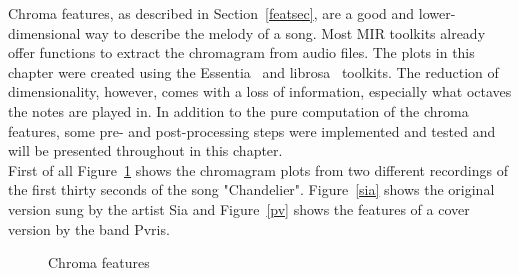 Chroma features, as described in Section~\ref{featsec}, are a good and lower-dimensional way to describe the melody of a song. Most MIR toolkits already offer functions to extract the chromagram from audio files. The plots in this chapter were created using the Essentia~\cite{essentia1} and librosa~\cite{librosa1} toolkits. 
The reduction of dimensionality, however, comes with a loss of information, especially what octaves the notes are played in. In addition to the pure computation of the chroma features, some pre- and post-processing steps were implemented and tested and will be presented throughout in this chapter.\\
First of all Figure~\ref{fig:chroma1} shows the chromagram plots from two different recordings of the first thirty seconds of the song "Chandelier". Figure~\ref{sia} shows the original version sung by the artist Sia and Figure~\ref{pv} shows the features of a cover version by the band Pvris. 
\begin{figure}[htbp]
	\centering
	\caption{Chroma features}
	\label{fig:chroma1}
\end{figure}
